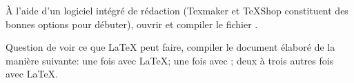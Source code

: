 \begin{exercice}[nosol]
  À l'aide d'un logiciel intégré de rédaction (Texmaker et TeXShop
  constituent des bonnes options pour débuter), ouvrir et compiler le
  fichier .
\end{exercice}

\begin{exercice}[nosol]
  Question de voir ce que {\LaTeX} peut faire, compiler le document
  élaboré  de la manière suivante: une
  fois avec {\LaTeX}; une fois avec {\BibTeX}; deux à trois autres
  fois avec {\LaTeX}.
\end{exercice}


